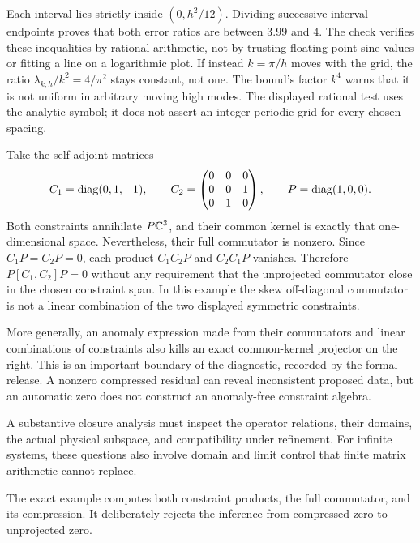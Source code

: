Each interval lies strictly inside $(0,h^2/12)$. Dividing successive interval endpoints proves that both error ratios are between $3.99$ and $4$. The check verifies these inequalities by rational arithmetic, not by trusting floating-point sine values or fitting a line on a logarithmic plot.
If instead $k=\pi/h$ moves with the grid, the ratio $\lambda_{k,h}/k^2=4/\pi^2$ stays constant, not one. The bound's factor $k^4$ warns that it is not uniform in arbitrary moving high modes. The displayed rational test uses the analytic symbol; it does not assert an integer periodic grid for every chosen spacing.

Take the self-adjoint matrices
\[
C_1=\operatorname{diag}(0,1,-1),\qquad
C_2=\begin{pmatrix}0&0&0\\0&0&1\\0&1&0\end{pmatrix},\qquad
P=\operatorname{diag}(1,0,0).
\]
Both constraints annihilate $P\CC^3$, and their common kernel is exactly that one-dimensional space. Nevertheless, their full commutator is nonzero.
Since $C_1P=C_2P=0$, each product $C_1C_2P$ and $C_2C_1P$ vanishes. Therefore $P[C_1,C_2]P=0$ without any requirement that the unprojected commutator close in the chosen constraint span. In this example the skew off-diagonal commutator is not a linear combination of the two displayed symmetric constraints.

More generally, an anomaly expression made from their commutators and linear combinations of constraints also kills an exact common-kernel projector on the right. This is an important boundary of the diagnostic, recorded by the formal release. A nonzero compressed residual can reveal inconsistent proposed data, but an automatic zero does not construct an anomaly-free constraint algebra.

A substantive closure analysis must inspect the operator relations, their domains, the actual physical subspace, and compatibility under refinement. For infinite systems, these questions also involve domain and limit control that finite matrix arithmetic cannot replace.

The exact example computes both constraint products, the full commutator, and its compression. It deliberately rejects the inference from compressed zero to unprojected zero.

